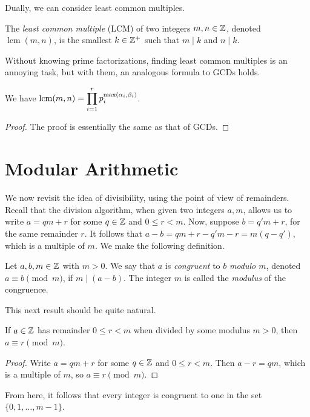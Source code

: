 \documentclass{article}
\DeclareMathOperator{\lcm}{lcm}
\begin{document}
Dually, we can consider least common multiples.
\begin{definition}
The \textit{least common multiple} (LCM) of two integers $m,n\in \mathbb Z$, denoted $\lcm(m,n)$, is the smallest $k\in \mathbb Z^+$ such that $m\mid k$ and $n\mid k$.
\end{definition}

Without knowing prime factorizations, finding least common multiples is an annoying task, but with them, an analogous formula to GCDs holds.
\begin{proposition}
We have $\lcm(m,n) = \ds\prod_{i=1}^r p_i^{\max( \alpha_i, \beta_i)}$.
\end{proposition}
\begin{proof}
The proof is essentially the same as that of GCDs.
\end{proof}
\newpage

\setcounter{section}{39}
\section{Modular Arithmetic}
We now revisit the idea of divisibility, using the point of view of remainders. Recall that the division algorithm, when given two integers $a,m$, allows us to write $a = qm + r$ for some $q\in \mathbb Z$ and $0 \leq r < m$. Now, suppose $b = q'm + r$, for the same remainder $r$. It follows that $a - b = qm + r - q'm -  r = m(q - q')$, which is a multiple of $m$. We make the following definition.
\begin{definition}
Let $a,b,m\in \mathbb Z$ with $m>0$. We say that $a$ is \textit{congruent} to $b$ \textit{modulo $m$}, denoted $a\equiv b\pmod m$, if $m\mid (a-b)$. The integer $m$ is called the \textit{modulus} of the congruence.
\end{definition}

This next result should be quite natural.
\begin{proposition}
If $a\in \mathbb Z$ has remainder $0 \leq r < m$ when divided by some modulus $m> 0$, then $a\equiv r\pmod m$.
\end{proposition}
\begin{proof}
Write $a = qm + r$ for some $q\in \mathbb Z$ and $0\leq r < m$. Then $a - r = qm$, which is a multiple of $m$, so $a\equiv r\pmod m$.
\end{proof}

From here, it follows that every integer is congruent to one in the set $\{0, 1, \ldots, m-1\}$.
\end{document}
